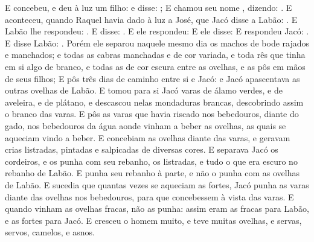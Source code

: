 {{  E concebeu, e deu à luz um filho: e disse: ;
  E chamou seu nome , dizendo: .
  E aconteceu, quando Raquel havia dado à luz a José, que Jacó disse a Labão: .
  E Labão lhe respondeu: .
  E disse: .
  E ele respondeu: 
  E ele disse:  E respondeu Jacó: .
  E disse Labão: .
  Porém ele separou naquele mesmo dia os machos de bode rajados e manchados; e todas as cabras manchadas e de cor variada, e toda rês que tinha em si algo de branco, e todas as de cor escura entre as ovelhas, e as pôs em mãos de seus filhos;
  E pôs três dias de caminho entre si e Jacó: e Jacó apascentava as outras ovelhas de Labão.
  E tomou para si Jacó varas de álamo verdes, e de aveleira, e de plátano, e descascou nelas mondaduras brancas, descobrindo assim o branco das varas.
  E pôs as varas que havia riscado nos bebedouros, diante do gado, nos bebedouros da água aonde vinham a beber as ovelhas, as quais se aqueciam vindo a beber.
  E concebiam as ovelhas diante das varas, e geravam crias listradas, pintadas e salpicadas de diversas cores.
  E separava Jacó os cordeiros, e os punha com seu rebanho, os listradas, e tudo o que era escuro no rebanho de Labão. E punha seu rebanho à parte, e não o punha com as ovelhas de Labão.
  E sucedia que quantas vezes se aqueciam as fortes, Jacó punha as varas diante das ovelhas nos bebedouros, para que concebessem à vista das varas.
  E quando vinham as ovelhas fracas, não as punha: assim eram as fracas para Labão, e as fortes para Jacó.
  E cresceu o homem muito, e teve muitas ovelhas, e servas, servos, camelos, e asnos.
\par }

}
